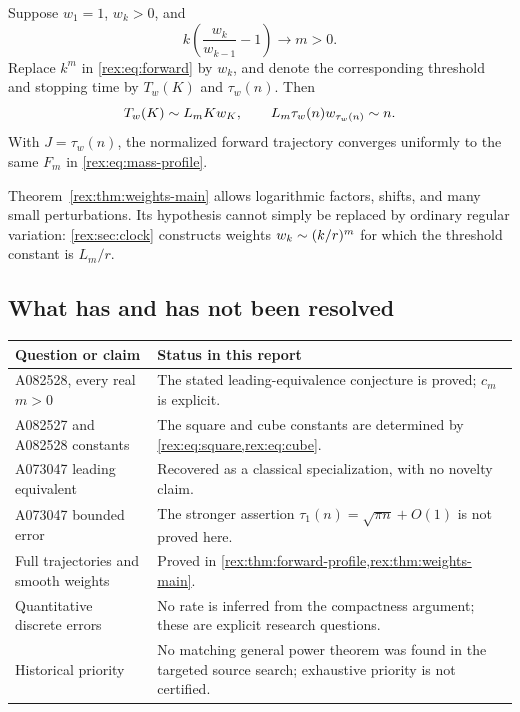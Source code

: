 \begin{theorem}\label{rex:thm:weights-main}
Suppose $w_1=1$, $w_k>0$, and
\begin{equation}\label{rex:eq:smooth-weights}
 k\left(\frac{w_k}{w_{k-1}}-1\right)\longrightarrow m>0.
\end{equation}
Replace $k^m$ in \cref{rex:eq:forward} by $w_k$, and denote the corresponding
threshold and stopping time by $T_w(K)$ and $\tau_w(n)$. Then
\begin{equation}\label{rex:eq:weights-main}
 T_w(K)\mathrel{\sim} L_m K w_K,\qquad
 L_m\tau_w(n)w_{\tau_w(n)}\mathrel{\sim} n.
\end{equation}
With $J=\tau_w(n)$, the normalized forward trajectory converges uniformly
to the same $F_m$ in \cref{rex:eq:mass-profile}.
\end{theorem}

Theorem~\ref{rex:thm:weights-main} allows logarithmic factors, shifts, and many
small perturbations. Its hypothesis cannot simply be replaced by ordinary
regular variation: \cref{rex:sec:clock} constructs weights
$w_k\mathrel{\sim}(k/r)^m$ for which the threshold constant is $L_m/r$.

\subsection{What has and has not been resolved}

\begin{center}
\small
\begin{tabular}{@{}p{.28\linewidth}p{.64\linewidth}@{}}
\toprule
Question or claim & Status in this report\\
\midrule
A082528, every real $m>0$ & The stated leading-equivalence conjecture is proved; $c_m$ is explicit.\\[3pt]
A082527 and A082528 constants & The square and cube constants are determined by \cref{rex:eq:square,rex:eq:cube}.\\[3pt]
A073047 leading equivalent & Recovered as a classical specialization, with no novelty claim.\\[3pt]
A073047 bounded error & The stronger assertion $\tau_1(n)=\sqrt{\pi n}+O(1)$ is not proved here.\\[3pt]
Full trajectories and smooth weights & Proved in \cref{rex:thm:forward-profile,rex:thm:weights-main}.\\[3pt]
Quantitative discrete errors & No rate is inferred from the compactness argument; these are explicit research questions.\\[3pt]
Historical priority & No matching general power theorem was found in the targeted source search; exhaustive priority is not certified.\\
\bottomrule
\end{tabular}
\end{center}

